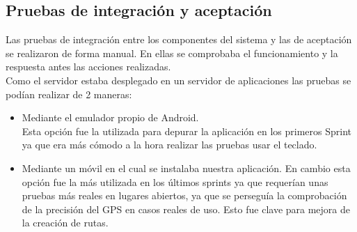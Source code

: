 \subsection{Pruebas de integración y aceptación}
Las pruebas de integración entre los componentes del sistema y las de aceptación se realizaron de forma manual. En ellas se comprobaba el funcionamiento y la respuesta antes las acciones realizadas.\\
	Como el servidor estaba desplegado en un servidor de aplicaciones las pruebas se podían realizar de 2 maneras:
\begin{itemize}
\item Mediante el emulador propio de Android.\\
Esta opción fue la utilizada para depurar la aplicación en los primeros Sprint ya que era más cómodo a la hora realizar las pruebas usar el teclado.
\item  Mediante un móvil en el cual se instalaba nuestra aplicación. En cambio esta opción  fue la más utilizada en los últimos sprints ya que requerían unas pruebas más reales en  lugares abiertos, ya que se perseguía la comprobación de la precisión del GPS  en casos reales de uso. Esto fue clave para mejora de la creación de rutas.
\end{itemize}







